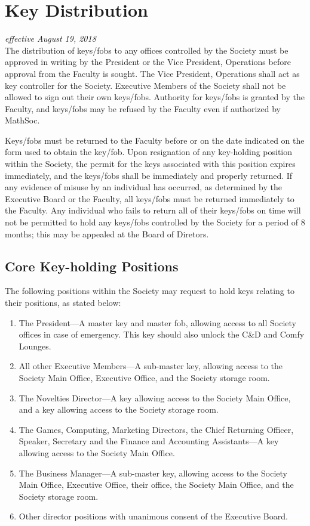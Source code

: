 \section{Key Distribution}
\emph{effective August 19, 2018}\\

The distribution of keys/fobs to any offices controlled by the Society must be
approved in writing by the President or the Vice President, Operations before
approval from the Faculty is sought. The Vice President, Operations shall act
as key controller for the Society. Executive Members of the Society shall not
be allowed to sign out their own keys/fobs. Authority for keys/fobs is granted
by the Faculty, and keys/fobs may be refused by the Faculty even if authorized
by MathSoc.

Keys/fobs must be returned to the Faculty before or on the date indicated on
the form used to obtain the key/fob. Upon resignation of any key-holding
position within the Society, the permit for the keys associated with this
position expires immediately, and the keys/fobs shall be immediately and
properly returned. If any evidence of misuse by an individual has occurred, as
determined by the Executive Board or the Faculty, all keys/fobs must be
returned immediately to the Faculty. Any individual who fails to return all of
their keys/fobs on time will not be permitted to hold any keys/fobs controlled
by the Society for a period of 8 months; this may be appealed at the Board of 
Diretors.

\subsection{Core Key-holding Positions}
The following positions within the Society may request to hold keys relating to
their positions, as stated below:
\begin{enumerate}
    \item The President---A master key and master fob, allowing access to all
        Society offices in case of emergency. This key should also unlock the C\&D
        and Comfy Lounges.
    \item All other Executive Members---A sub-master key, allowing access to the
        Society Main Office, Executive Office, and the Society storage room.
    \item The Novelties Director---A key allowing access to the Society Main
        Office, and a key allowing access to the Society storage room.
    \item The Games, Computing, Marketing Directors, the Chief Returning Officer,
        Speaker, Secretary and the Finance and Accounting Assistants---A key
        allowing access to the Society Main Office.
    \item The Business Manager---A sub-master key, allowing access to the Society
        Main Office, Executive Office, their office, the Society Main Office, and
        the Society storage room.
    \item Other director positions with unanimous consent of the
        Executive Board.
\end{enumerate}

